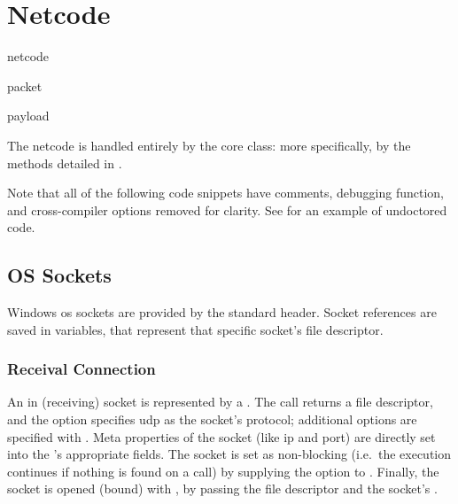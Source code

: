 \section{Netcode}\label{sc:middleware:netcode}

\begin{definition}{netcode}
\end{definition}

\begin{definition}{packet}
\end{definition}

\begin{definition}{payload}
\end{definition}

The netcode is handled entirely by the core  class: more specifically, by the methods detailed in .



Note that all of the following code snippets have comments, debugging function, and cross-compiler options removed for  clarity. See  for an example of undoctored code.

\subsection{OS Sockets}

Windows \gls{os} sockets are provided by the  standard  header. Socket references are saved in  variables, that represent that specific socket's file descriptor.

\subsubsection{Receival Connection}

An in (receiving) socket is represented by a . The  call returns a file descriptor, and the  option specifies \gls{udp} as the socket's protocol; additional options are specified with . Meta properties of the socket (like \acrshort{ip} and port) are directly set into the 's appropriate fields. The socket is set as non-blocking (i.e.\ the execution continues if nothing is found on a  call) by supplying the  option to . Finally, the socket is opened (bound) with , by passing the file descriptor and the socket's .

